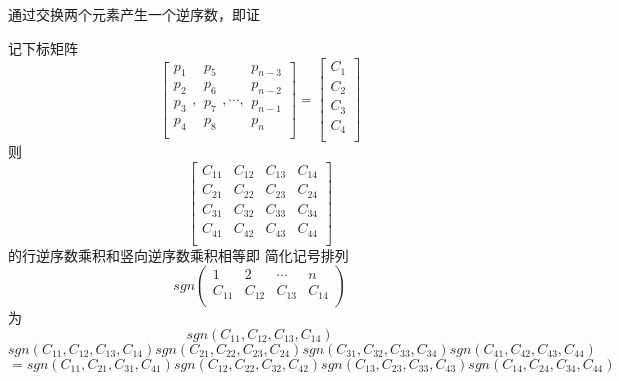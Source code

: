 \documentclass{amsc}          %
\numberwithin{equation}{section} %
\begin{document}
\begin{prof}
通过交换两个元素产生一个逆序数，即证
\end{prof}

\begin{lemma}\label{15}
记下标矩阵$$\left[
  \begin{array}{ccc}   %
    p_{1} \\  %
    p_{2} \\  %
    p_{3}\\
    p_{4}\\
  \end{array},              %
  \begin{array}{ccc}   %
    p_{5} \\  %
    p_{6} \\  %
    p_{7}\\
    p_{8}\\
  \end{array},
\cdots ,           %
  \begin{array}{ccc}   %
    p_{n-3} \\  %
    p_{n-2} \\  %
    p_{n-1}\\
    p_{n}\\
  \end{array}
\right]=\left[
  \begin{array}{ccc}   %
    C_{1} \\  %
    C_{2} \\  %
    C_{3}\\
    C_{4}\\
  \end{array}\right]$$
则
$$\left[
  \begin{array}{cccc}   %
    C_{11} & C_{12} & C_{13} & C_{14}\\  %
    C_{21} & C_{22} & C_{23} & C_{24}\\  %
    C_{31} & C_{32} & C_{33} & C_{34}\\
    C_{41} & C_{42} & C_{43} & C_{44}\\
  \end{array}\right]$$
  的行逆序数乘积和竖向逆序数乘积相等即
  简化记号排列
  $$sgn\left(
\begin{array}{cccc}
1 & 2 & \cdots & n\\
C_{11} & C_{12} & C_{13} & C_{14}\\
\end{array}\right)$$为$$sgn(C_{11},C_{12},C_{13},C_{14})$$
  $$sgn(C_{11},C_{12},C_{13},C_{14})sgn(C_{21},C_{22},C_{23},C_{24})sgn(C_{31},C_{32},C_{33},C_{34})sgn(C_{41},C_{42},C_{43},C_{44})$$
  $$=sgn(C_{11},C_{21},C_{31},C_{41})sgn(C_{12},C_{22},C_{32},C_{42})sgn(C_{13},C_{23},C_{33},C_{43})sgn(C_{14},C_{24},C_{34},C_{44})$$
\end{lemma}
\end{document}
